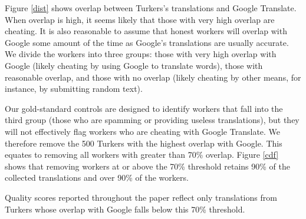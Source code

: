 \documentclass[11pt]{article}
\begin{document}
Figure \ref{dist} shows overlap between Turkers's translations and Google Translate.  When overlap is high, it seems likely that those with very high overlap are cheating.  It is also reasonable to assume that honest workers will overlap with Google some amount of the time as Google's translations are usually accurate. We divide the workers into three groups: those with very high overlap with Google (likely cheating by using Google to translate words), those with reasonable overlap, and those with no overlap (likely cheating by other means, for instance, by submitting random text).  
 
Our gold-standard controls are designed to identify workers that fall into the third group (those who are spamming or providing useless translations), but they will not effectively flag workers who are cheating with Google Translate. We therefore remove the 500 Turkers with the highest overlap with Google. This equates to removing all workers with greater than 70\% overlap. Figure \ref{cdf} shows that removing workers at or above the 70\% threshold retains 90\% of the collected translations and over 90\% of the workers.

Quality scores reported throughout the paper reflect only translations from Turkers whose overlap with Google falls below this 70\% threshold.
\end{document}
